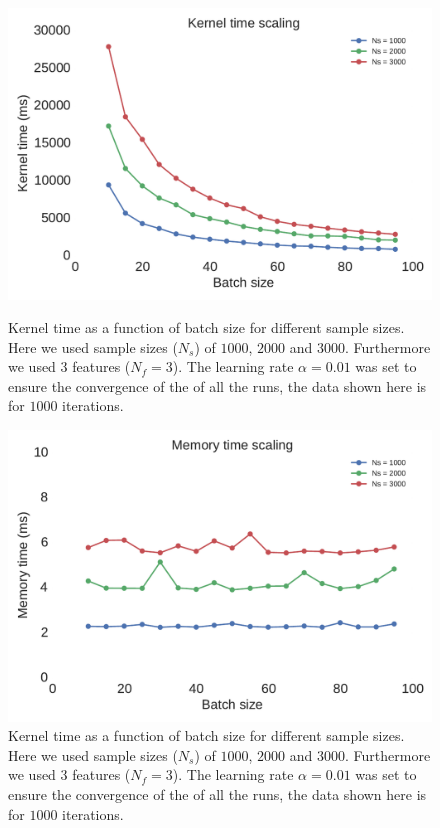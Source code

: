 \documentclass[11pt,a4paper]{article}
\begin{document}
\begin{figure}[H]
	\centering
  \includegraphics[width=\linewidth]{batch_size_scaling_kernel.pdf}
  \caption{Kernel time as a function of batch size for different sample sizes. Here we used sample sizes ($N_s$) of $1000$, $2000$ and $3000$. Furthermore we used $3$ features ($N_f=3$). The learning rate $\alpha=0.01$ was set to ensure the convergence of the of all the runs, the data shown here is for $1000$ iterations.}
  \label{fig:batch_size_scaling_kernel}
\endminipage
\hfill
{}
  \includegraphics[width=\linewidth]{batch_size_scaling_memory.pdf}
  \caption{Kernel time as a function of batch size for different sample sizes. Here we used sample sizes ($N_s$) of $1000$, $2000$ and $3000$. Furthermore we used $3$ features ($N_f=3$). The learning rate $\alpha=0.01$ was set to ensure the convergence of the of all the runs, the data shown here is for $1000$ iterations.}
  \label{fig:batch_size_scaling_memory}
\endminipage
\end{figure}
\end{document}
